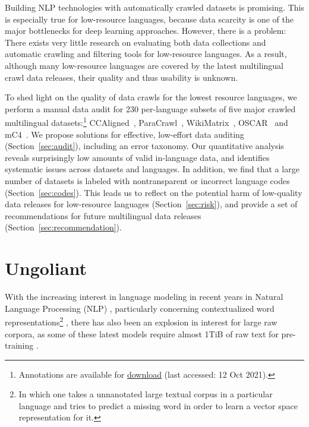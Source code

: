 Building NLP technologies with automatically crawled datasets is promising. This is especially true for low-resource languages, because data scarcity is one of the major bottlenecks for deep learning approaches.
However, there is a problem: There exists very little research on evaluating both data collections and automatic crawling and filtering tools for low-resource languages.
As a result, although many low-resource languages are covered by the latest multilingual crawl data releases, their quality and thus usability is unknown.

To shed light on the quality of data crawls for the lowest resource languages, we perform a manual data audit for 230 per-language subsets of five major crawled multilingual datasets:\footnote{Annotations are available for
    \href{https://storage.googleapis.com/huggingface-nlp/datasets/masakhane_audit_annotations/masakhane_language_audit.zip}{download} (last accessed: 12 Oct 2021).}
CCAligned~\citep{el-kishky-etal-2020-ccaligned}, ParaCrawl~\citep{espla-etal-2019-paracrawl,banon-etal-2020-paracrawl}, WikiMatrix~\citep{schwenk-etal-2021-wikimatrix}, OSCAR~\citep{ortiz-suarez-etal-2019-asynchronous, ortiz-suarez-etal-2020-monolingual} and mC4~\citep{xue-etal-2021-mt5}. We propose solutions for effective, low-effort data auditing (Section~\ref{sec:audit}), including an error taxonomy. Our quantitative analysis reveals surprisingly low amounts of valid in-language data, and identifies systematic issues across datasets and languages. In addition, we find that a large number of datasets is labeled with nontransparent or incorrect language codes (Section~\ref{sec:codes}). This leads us to reflect on the potential harm of low-quality data releases for low-resource languages (Section~\ref{sec:risk}), and provide a set of recommendations for future multilingual data releases (Section~\ref{sec:recommendation}).

\section{Ungoliant}

With the increasing interest in language modeling in recent years in Natural Language Processing (NLP) \citep{rogers-etal-2020-primer}, particularly concerning contextualized word representations\footnote{In which one takes a unnanotated large textual corpus in a particular language and tries to predict a missing word in order to learn a vector space representation for it.} \citep{peters-etal-2018-deep,devlin-etal-2019-bert}, there has also been an explosion in interest for large raw corpora, as some of these latest models require almost 1TiB of raw text for pre-training \citep{raffel-etal-2020-exploring,brown-etal-2020-language}.

